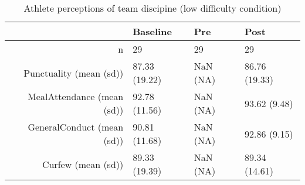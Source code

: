 \begin{table}[ht]
\centering
\begin{tabular}{rlll}
  \hline
 & Baseline & Pre & Post \\ 
  \hline
n &    29 &  29 &    29 \\ 
  Punctuality (mean (sd)) & 87.33 (19.22) & NaN (NA) & 86.76 (19.33) \\ 
  MealAttendance (mean (sd)) & 92.78 (11.56) & NaN (NA) & 93.62 (9.48) \\ 
  GeneralConduct (mean (sd)) & 90.81 (11.68) & NaN (NA) & 92.86 (9.15) \\ 
  Curfew (mean (sd)) & 89.33 (19.39) & NaN (NA) & 89.34 (14.61) \\ 
   \hline
\end{tabular}
\caption{Athlete perceptions of 
 team discipine (low difficulty condition)} 
\end{table}
